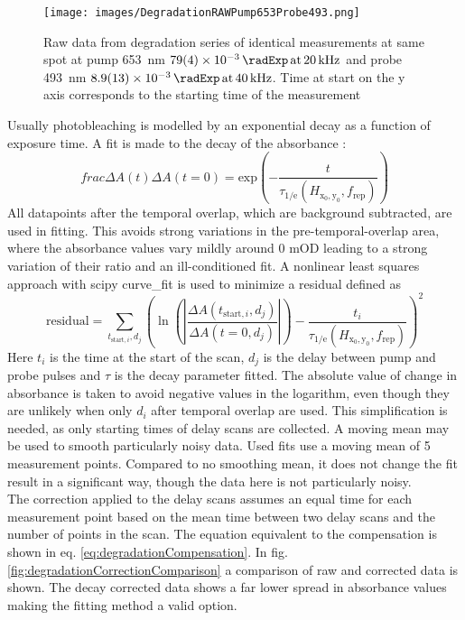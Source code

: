 \documentclass[twoside,openright,listof=numbered]{scrreprt}
\def\pumpExp#1{\ensuremath{\SI{#1}{\radExp}\,\mathrm{at}\, \SI{20}{\kilo\hertz}}}
\def\probeExp#1{\ensuremath{\SI{#1}{\radExp}\,\mathrm{at}\, \SI{40}{\kilo\hertz}}}
\def\radiantExp{\ensuremath{H_\mathrm{x_0,y_0}}}
\begin{document}
\begin{figure}[hbtp]
\centering
\texttt{[image: images/DegradationRAWPump653Probe493.png]}
\caption[Raw data from degradation series of identical measurements at same spot at pump \SI{653}{\nano\meter} and probe \SI{493}{\nano\meter}.]{Raw data from degradation series of identical measurements at same spot at pump \SI{653}{\nano\meter} \pumpExp{79(4)e-3} and probe \SI{493}{\nano\meter} \probeExp{8.9(1.3)e-3}.
Time at start on the y axis corresponds to the starting time of the measurement\label{fig:rawDegradation}}
\end{figure}
Usually photobleaching is modelled by an exponential decay as a function of exposure time. A fit is made to the decay of the absorbance :
\begin{equation}
frac{\Delta A\left(t\right)}{\Delta A\left(t=0\right)} = \mathrm{exp}\left(-\frac{t}{\tau_\text{1/e}\left(\radiantExp, f_\text{rep}\right)}\right)
\end{equation}
All datapoints after the temporal overlap, which are background subtracted, are used in fitting. This avoids strong variations in the pre-temporal-overlap area, where the absorbance values vary mildly around 0 mOD leading to a strong variation of their ratio and an ill-conditioned fit. A nonlinear least squares approach with scipy curve\_fit is used to minimize a residual defined as
\begin{equation}\label{eq:degradationFitting}
\mathrm{residual} = \sum_{t_{\text{start},i},d_j} \left(\ln\left(\left\lvert\frac{\Delta A(t_{\text{start},i},d_j)}{\Delta A(t=0,d_j)}\right\rvert\right)- \frac{t_i}{\tau_\text{1/e}\left(\radiantExp, f_\text{rep}\right)}\right)^2
\end{equation}
Here $t_i$ is the time at the start of the scan, $d_j$ is the delay between pump and probe pulses and $\tau$ is the decay parameter fitted. The absolute value of change in absorbance is taken to avoid negative values in the logarithm, even though they are unlikely when only $d_i$ after temporal overlap are used.  This simplification is needed, as only starting times of delay scans are collected. A moving mean may be used to smooth particularly noisy data. Used fits use a moving mean of 5 measurement points. Compared to no smoothing mean, it does not change the fit result in a significant way, though the data here is not particularly noisy.\\
The correction applied to the delay scans assumes an equal time for each measurement point based on the mean time between two delay scans and the number of points in the scan. The equation equivalent to the compensation is shown in eq. \ref{eq:degradationCompensation}. In fig. \ref{fig:degradationCorrectionComparison} a comparison of raw and corrected data is shown. The decay corrected data shows a far lower spread in absorbance values making the fitting method a valid option. 
\end{document}
